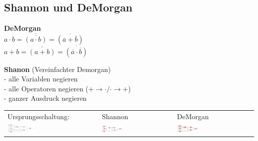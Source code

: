 \subsection{Shannon und DeMorgan}
\begin{multicols}{2}
	\textbf{DeMorgan}\\
	$a \cdot b = \overline{\overline{(a \cdot b)}}= \overline{(\overline{a} + \overline{b})}$\\
	$a + b =  \overline{\overline{(a + b)}}= \overline{(\overline{a} \cdot \overline{b})}$

	\textbf{Shanon} (Vereinfachter Demorgan)\\
	- alle Variablen negieren\\
	- alle Operatoren negieren ($+ \rightarrow \cdot / \cdot \rightarrow +$)\\
	- ganzer Ausdruck negieren
\end{multicols}
\begin{tabular}{lll}
	Ursprungsschaltung: & Shannon & DeMorgan\\
		\includegraphics[width=0.3\textwidth]{pics/shanonursprung} & 
		\includegraphics[width=0.3\textwidth]{pics/shanonende} &
		\includegraphics[width=0.3\textwidth]{pics/demorganende}\\
\end{tabular}


